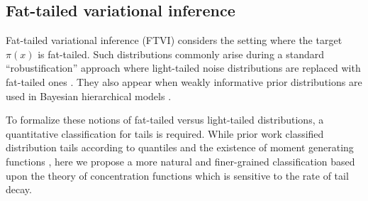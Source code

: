 \documentclass[twoside]{article}
\theoremstyle{definition}
\theoremstyle{remark}
\begin{document}
\vspace{-2mm}
\subsection{Fat-tailed variational inference}

\vspace{-1mm}
Fat-tailed variational inference (FTVI)
considers the setting where the target $\pi(x)$ is fat-tailed. 
Such distributions commonly arise during a standard
``robustification'' approach where light-tailed noise distributions are
replaced with fat-tailed ones \citep{tipping2005variational}. They also
appear when weakly informative prior distributions are used in Bayesian
hierarchical models \citep{gelman2006prior}.




To formalize these notions of fat-tailed versus light-tailed distributions, a quantitative classification for tails is required.
While prior work classified distribution tails according to quantiles and the existence of moment generating functions
\citep[Section 3]{jaini2020tails}, here we propose a more natural and finer-grained classification based upon
the theory of concentration functions \citep[Chapter 1.2]{ledoux2001concentration} which is sensitive to
the rate of tail decay.
\end{document}
